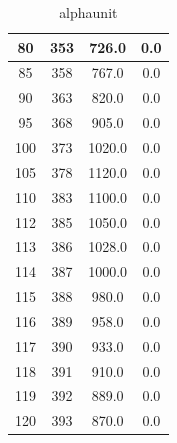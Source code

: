 \documentclass{double}
\begin{document}
\begin{table}[H]
{\begin{tabular}{|c|c|c|c|}
80 & 353 & 726.0 & 0.0\\\hline
85 & 358 & 767.0 & 0.0\\\hline
90 & 363 & 820.0 & 0.0\\\hline
95 & 368 & 905.0 & 0.0\\\hline
100 & 373 & 1020.0 & 0.0\\\hline
105 & 378 & 1120.0 & 0.0\\\hline
110 & 383 & 1100.0 & 0.0\\\hline
112 & 385 & 1050.0 & 0.0\\\hline
113 & 386 & 1028.0 & 0.0\\\hline
114 & 387 & 1000.0 & 0.0\\\hline
115 & 388 & 980.0 & 0.0\\\hline
116 & 389 & 958.0 & 0.0\\\hline
117 & 390 & 933.0 & 0.0\\\hline
118 & 391 & 910.0 & 0.0\\\hline
119 & 392 & 889.0 & 0.0\\\hline
120 & 393 & 870.0 & 0.0\\\hline
\end{tabular}}
\caption{alphaunit}
\label{t:alphaunit}\end{table}
\end{document}
